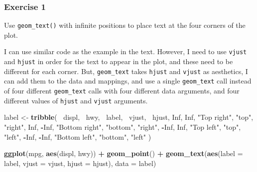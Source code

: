 \documentclass[]{book}
\newenvironment{Shaded}{\begin{snugshade}}{\end{snugshade}}
\newcommand{\DataTypeTok}[1]{\textcolor[rgb]{0.13,0.29,0.53}{#1}}
\newcommand{\KeywordTok}[1]{\textcolor[rgb]{0.13,0.29,0.53}{\textbf{#1}}}
\newcommand{\NormalTok}[1]{#1}
\newcommand{\OperatorTok}[1]{\textcolor[rgb]{0.81,0.36,0.00}{\textbf{#1}}}
\newcommand{\OtherTok}[1]{\textcolor[rgb]{0.56,0.35,0.01}{#1}}
\newcommand{\StringTok}[1]{\textcolor[rgb]{0.31,0.60,0.02}{#1}}
\theoremstyle{definition}
\theoremstyle{definition}
\theoremstyle{definition}
\theoremstyle{remark}
\begin{document}
\hypertarget{exercise-1-69}{%
\subsubsection{Exercise 1}\label{exercise-1-69}}

Use \texttt{geom\_text()} with infinite positions to place text at the
four corners of the plot.

I can use similar code as the example in the text. However, I need to
use \texttt{vjust} and \texttt{hjust} in order for the text to appear in
the plot, and these need to be different for each corner. But,
\texttt{geom\_text} takes \texttt{hjust} and \texttt{vjust} as
aesthetics, I can add them to the data and mappings, and use a single
\texttt{geom\_text} call instead of four different \texttt{geom\_text}
calls with four different data arguments, and four different values of
\texttt{hjust} and \texttt{vjust} arguments.

\begin{Shaded}
\begin{Highlighting}[]
\NormalTok{label <-}\StringTok{ }\KeywordTok{tribble}\NormalTok{(}
  \OperatorTok{~}\NormalTok{displ, }\OperatorTok{~}\NormalTok{hwy, }\OperatorTok{~}\NormalTok{label, }\OperatorTok{~}\NormalTok{vjust, }\OperatorTok{~}\NormalTok{hjust,}
     \OtherTok{Inf}\NormalTok{,  }\OtherTok{Inf}\NormalTok{,    }\StringTok{"Top right"}\NormalTok{, }\StringTok{"top"}\NormalTok{, }\StringTok{"right"}\NormalTok{,}
     \OtherTok{Inf}\NormalTok{, }\OperatorTok{-}\OtherTok{Inf}\NormalTok{,    }\StringTok{"Bottom right"}\NormalTok{, }\StringTok{"bottom"}\NormalTok{, }\StringTok{"right"}\NormalTok{,}
    \OperatorTok{-}\OtherTok{Inf}\NormalTok{,  }\OtherTok{Inf}\NormalTok{,    }\StringTok{"Top left"}\NormalTok{, }\StringTok{"top"}\NormalTok{, }\StringTok{"left"}\NormalTok{,}
    \OperatorTok{-}\OtherTok{Inf}\NormalTok{, }\OperatorTok{-}\OtherTok{Inf}\NormalTok{,    }\StringTok{"Bottom left"}\NormalTok{, }\StringTok{"bottom"}\NormalTok{, }\StringTok{"left"}
\NormalTok{)}

\KeywordTok{ggplot}\NormalTok{(mpg, }\KeywordTok{aes}\NormalTok{(displ, hwy)) }\OperatorTok{+}
\StringTok{  }\KeywordTok{geom_point}\NormalTok{() }\OperatorTok{+}
\StringTok{  }\KeywordTok{geom_text}\NormalTok{(}\KeywordTok{aes}\NormalTok{(}\DataTypeTok{label =}\NormalTok{ label, }\DataTypeTok{vjust =}\NormalTok{ vjust, }\DataTypeTok{hjust =}\NormalTok{ hjust), }\DataTypeTok{data =}\NormalTok{ label)}
\end{Highlighting}
\end{Shaded}
\end{document}
